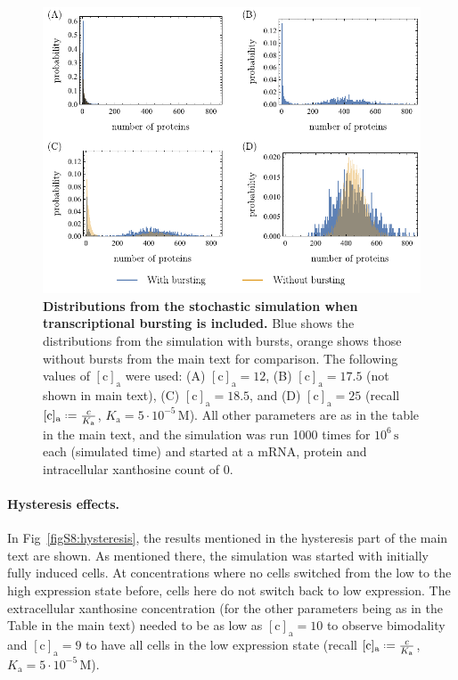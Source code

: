 \documentclass[10pt,letterpaper]{article}
\newcommand{\unit}[1]{\,\mathrm{#1}}
\newcommand{\n}[1]{\mathrm{#1}}
\newcommand*{\defeq}{\mathrel{\vcenter{\baselineskip0.5ex \lineskiplimit0pt
			\hbox{\scriptsize.}\hbox{\scriptsize.}}}%
	=}
\begin{document}
\begin{figure}
	\centering
	\includegraphics[width=1\textwidth]{FigSI6_7_2.pdf}
	\caption{{\bf Distributions from the stochastic simulation when transcriptional bursting is included.}
		Blue shows the distributions from the simulation with bursts, orange shows those without bursts from the main text for comparison. The following values of $\mathrm{[c]_a}$ were used: (A) $\n{[c]_a}=12$, (B) $\n{[c]_a}=17.5$ (not shown in main text), (C) $\mathrm{[c]_a}=18.5$, and (D) $\mathrm{[c]_a}=25$ (recall $\n{[c]_{a}} \defeq \frac{c}{K_{\n{a}}}$,
		$K_{\n{a}} = 5 \cdot 10^{-5} \unit{M}$). All other parameters are as in the table in the main text, and the simulation
		was run 1000 times for $10^6 \unit{s}$ each (simulated time) and
		started at a mRNA, protein and intracellular xanthosine count of 0.}
	\label{distbursts}
\end{figure} 

\paragraph*{Hysteresis effects.}
In Fig~\ref{figS8:hysteresis}, the results mentioned in the hysteresis part of the main text are shown. As mentioned there,  the simulation was started with initially fully induced cells. At concentrations where no cells switched from the low to the high expression state before, cells here do not switch back to low expression. The extracellular xanthosine concentration (for the other parameters being as in the Table in the main text) needed to be as low as $\n{[c]_a} = 10$ to observe bimodality and $\n{[c]_a}=9$ to have all cells in the low expression state (recall $\n{[c]_{a}} \defeq \frac{c}{K_{\n{a}}}$, $K_{\n{a}} = 5 \cdot
10^{-5} \unit{M}$).
\end{document}
